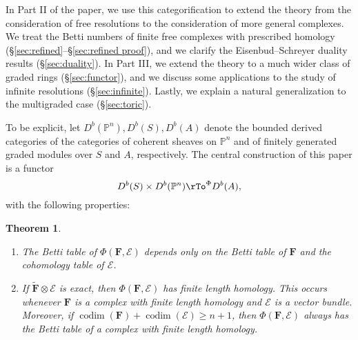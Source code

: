 \documentclass[12pt]{amsart}
\newtheorem{theorem}[lemma]{Theorem}
\theoremstyle{definition}
\theoremstyle{remark}
\newcommand{\kk}{\Bbbk}
\newcommand{\codim}{\operatorname{codim}}
\newcommand{\cE}{\mathcal{E}}
\newcommand{\FF}{\mathbf{F}}
\renewcommand{\P}{{\mathbb P}}
\begin{document}
In Part II of the paper, we use this categorification to extend the theory from the consideration of free resolutions to the consideration of more general complexes. We treat the Betti numbers of finite free complexes with prescribed homology  (\S\ref{sec:refined}--\S\ref{sec:refined proof}), and we clarify the Eisenbud--Schreyer duality results (\S\ref{sec:duality}).  In Part III, we extend the theory to a much wider class of graded rings (\S\ref{sec:functor}), and we discuss some applications to the study of infinite resolutions (\S\ref{sec:infinite}).  Lastly, we explain a natural generalization to the multigraded case (\S\ref{sec:toric}).

To be explicit, 
let $D^{b}(\P^{n}), D^{b}(S), D^{b}(A)$ denote the bounded derived categories of the categories of coherent sheaves on $\P^{n}$ and of finitely generated graded modules over $S$ and $A$, respectively.  The central construction of this paper is a functor
$$
D^{b}(S)\times D^{b}(\P^{n})  \rTo^{\Phi} D^{b}(A),
$$
with the following properties:
\begin{theorem}\label{thm:Phi}
\begin{enumerate}
	\item\label{thm:Phi:1}  The Betti table of $\Phi(\FF,\cE)$ depends only on the Betti table of $\FF$ and the cohomology table of $\cE$.
	\item\label{thm:Phi:2}  If $\widetilde{\FF}\otimes \cE$ is exact, then $\Phi(\FF,\cE)$ has finite length homology.  This occurs whenever $\FF$ is a complex with finite length homology and $\cE$ is a vector bundle.  Moreover, if $\codim(\FF)+\codim(\cE)\geq n+1$, then $\Phi(\FF,\cE)$ always has the Betti table of a complex with finite length homology.
\end{enumerate}
\end{theorem}
\end{document}
